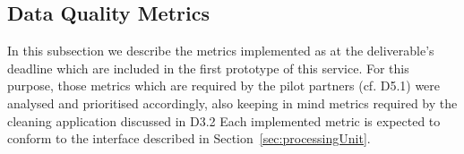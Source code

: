 
\subsection{Data Quality Metrics}
\label{sec:DQMetrics} 



In this subsection we describe the metrics implemented as at the deliverable's deadline which are included in the first prototype of this service.
For this purpose, those metrics which are required by the pilot partners (cf. D5.1) were analysed and prioritised accordingly, also keeping in mind metrics required by the cleaning application discussed in D3.2
Each implemented metric is expected to conform to the interface described in Section~\ref{sec:processingUnit}.






